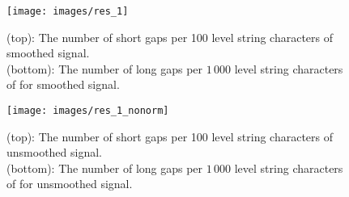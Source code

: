 \begin{figure}
\centerline{\texttt{[image: images/res\_1]}}
\caption[TODO]{(top): The number of short gaps per 100 level string characters of smoothed signal.\\
(bottom): The number of long gaps per $1\,000$ level string characters of for smoothed signal.}
\label{obr:res_1}
\end{figure}

\begin{figure}
\centerline{\texttt{[image: images/res\_1\_nonorm]}}
\caption[TODO]{(top): The number of short gaps per 100 level string characters of unsmoothed signal.\\
(bottom): The number of long gaps per $1\,000$ level string characters of for unsmoothed signal.}
\label{obr:res_1_nonorm}
\end{figure}
